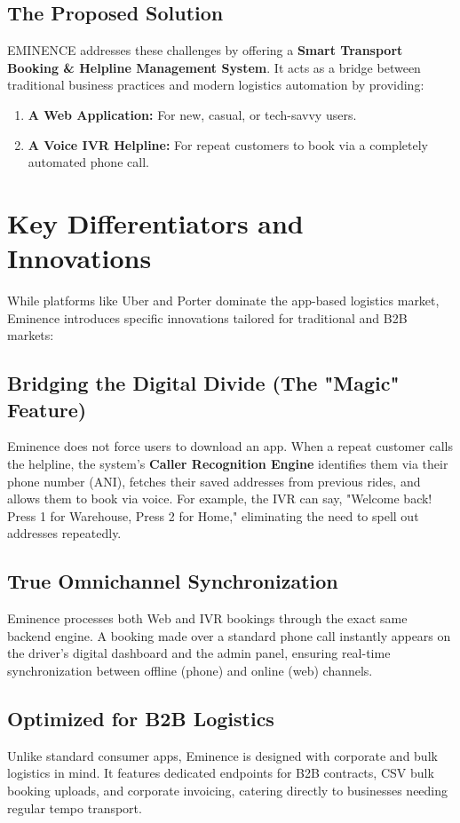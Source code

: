\documentclass[journal,10pt,twocolumn]{IEEEtran}
\begin{document}
\subsection{The Proposed Solution}
EMINENCE addresses these challenges by offering a \textbf{Smart Transport Booking \& Helpline Management System}. It acts as a bridge between traditional business practices and modern logistics automation by providing:
\begin{enumerate}
    \item \textbf{A Web Application:} For new, casual, or tech-savvy users.
    \item \textbf{A Voice IVR Helpline:} For repeat customers to book via a completely automated phone call.
\end{enumerate}

\section{Key Differentiators and Innovations}
While platforms like Uber and Porter dominate the app-based logistics market, Eminence introduces specific innovations tailored for traditional and B2B markets:

\subsection{Bridging the Digital Divide (The "Magic" Feature)}
Eminence does not force users to download an app. When a repeat customer calls the helpline, the system's \textbf{Caller Recognition Engine} identifies them via their phone number (ANI), fetches their saved addresses from previous rides, and allows them to book via voice. For example, the IVR can say, "Welcome back! Press 1 for Warehouse, Press 2 for Home," eliminating the need to spell out addresses repeatedly.

\subsection{True Omnichannel Synchronization}
Eminence processes both Web and IVR bookings through the exact same backend engine. A booking made over a standard phone call instantly appears on the driver's digital dashboard and the admin panel, ensuring real-time synchronization between offline (phone) and online (web) channels.

\subsection{Optimized for B2B Logistics}
Unlike standard consumer apps, Eminence is designed with corporate and bulk logistics in mind. It features dedicated endpoints for B2B contracts, CSV bulk booking uploads, and corporate invoicing, catering directly to businesses needing regular tempo transport.
\end{document}
